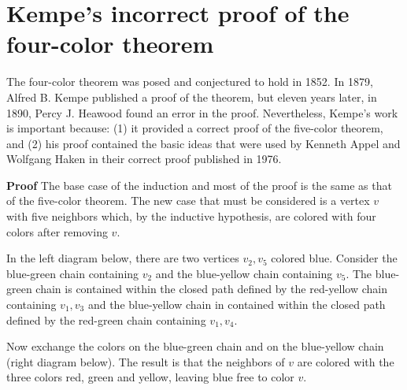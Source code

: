 \documentclass[11pt,a4paper]{article}
\begin{document}


\section{Kempe's incorrect proof of the four-color theorem}\label{s.kempe}

The four-color theorem was posed and conjectured to hold in 1852. In 1879, Alfred B. Kempe published a proof of the theorem,  but eleven years later, in 1890, Percy J. Heawood found an error in the proof. Nevertheless, Kempe's work is important because: (1) it provided a correct proof of the five-color theorem, and (2) his proof contained the basic ideas that were used by Kenneth Appel and Wolfgang Haken in their correct proof published in 1976.

\textbf{Proof} The base case of the induction and most of the proof is the same as that of the five-color theorem. The new case that must be considered is a vertex $v$ with five neighbors which, by the inductive hypothesis, are colored with four colors after removing $v$.

In the left diagram below, there are two vertices $v_2,v_5$ colored blue. Consider the blue-green chain containing $v_2$ and the blue-yellow chain containing $v_5$. The blue-green chain is contained within the closed path defined by the red-yellow chain containing $v_1,v_3$ and the blue-yellow chain in contained within the closed path defined by the red-green chain containing $v_1,v_4$.

Now exchange the colors on the blue-green chain and on the blue-yellow chain (right diagram below). The result is that the neighbors of $v$ are colored with the three colors red, green and yellow, leaving blue free to color $v$.
\end{document}

